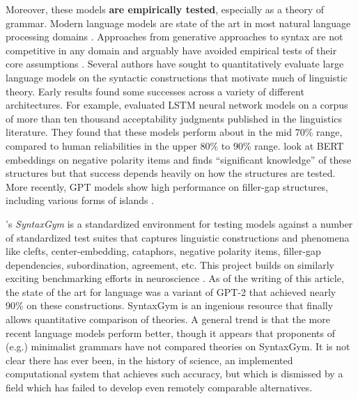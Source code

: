 \documentclass[output=paper,colorlinks,citecolor=brown
]{langscibook}
\begin{document}

Moreover, these models \textbf{are empirically tested}, especially as a theory of grammar. Modern language models are state of the art in most natural language processing domains \citep{bommasani2021opportunities}. Approaches from generative approaches to syntax are not competitive in any domain and arguably have avoided empirical tests of their core assumptions \citep{edelman2003seriously}. Several authors have sought to quantitatively evaluate large language models on the syntactic constructions that motivate much of linguistic theory. Early results found some successes across a variety of different architectures. For example, \cite{warstadt2019neural} evaluated LSTM neural network models on a corpus of more than ten thousand acceptability judgments published in the linguistics literature. They found that these models perform about in the mid $70\%$ range, compared to human reliabilities in the upper $80\%$ to $90\%$ range. \cite{warstadt2019investigating} look at BERT embeddings on negative polarity items and finds ``significant knowledge'' of these structures but that success depends heavily on how the structures are tested. More recently, GPT models show high performance on filler-gap structures, including various forms of islands \citep{wilcox2018rnn,wilcox2022using}.

\cite{gauthier2020syntaxgym}'s \emph{SyntaxGym} is a standardized environment for testing models against a number of standardized test suites that captures linguistic constructions and phenomena like clefts, center-embedding, cataphors, negative polarity items, filler-gap dependencies, subordination, agreement, etc. This project builds on similarly exciting benchmarking efforts in neuroscience \citep{schrimpf2020integrative}. As of the writing of this article, the state of the art for language was a variant of GPT-2 that achieved nearly $90\%$ on these constructions. SyntaxGym is an ingenious resource that finally allows quantitative comparison of theories. A general trend is that the more recent language models perform better, though it appears that proponents of (e.g.) minimalist grammars have not compared theories on SyntaxGym. It is not clear there has ever been, in the history of science, an implemented computational system that achieves such accuracy, but which is dismissed by a field which has failed to develop even remotely comparable alternatives.
\end{document}
